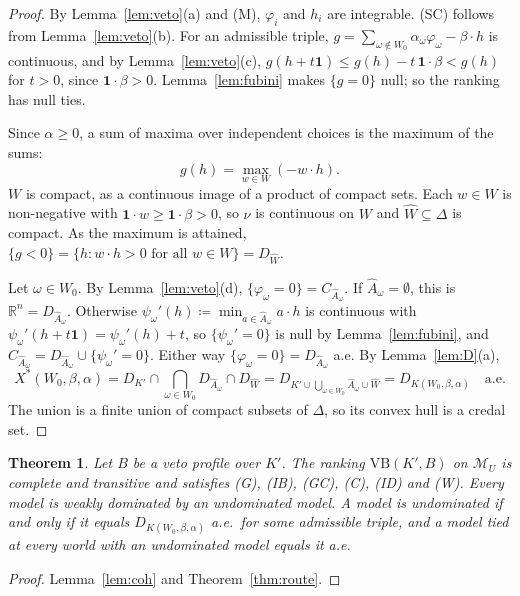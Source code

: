 \documentclass[11pt]{article}
\newcommand{\R}{\mathbb{R}}
\newcommand{\one}{\mathbf{1}}
\newcommand{\M}{\mathcal{M}}
\newcommand{\VB}{\mathrm{VB}}
\theoremstyle{plain}
\newtheorem{theorem}{Theorem}[section]
\theoremstyle{definition}
\theoremstyle{remark}
\begin{document}
\begin{proof}
By Lemma~\ref{lem:veto}(a) and (M), $\varphi_i$ and $h_i$ are integrable. (SC) follows from
Lemma~\ref{lem:veto}(b). For an admissible triple, $g=\sum_{\omega\notin W_0}
\alpha_\omega\varphi_\omega-\beta\cdot h$ is continuous, and by Lemma~\ref{lem:veto}(c),
$g(h+t\one)\le g(h)-t\,\one\cdot\beta<g(h)$ for $t>0$, since $\one\cdot\beta>0$.
Lemma~\ref{lem:fubini} makes $\{g=0\}$ null; so the ranking has null ties.

Since $\alpha\ge0$, a sum of maxima over independent choices is the maximum of the sums:
\[
  g(h)=\max_{w\in W}(-w\cdot h).
\]
$W$ is compact, as a continuous image of a product of compact sets. Each $w\in W$ is
non-negative with $\one\cdot w\ge\one\cdot\beta>0$, so $\nu$ is continuous on $W$ and
$\hat W\subseteq\Delta$ is compact. As the maximum is attained, $\{g<0\}=\{h:w\cdot h>0
\text{ for all }w\in W\}=D_{\hat W}$.

Let $\omega\in W_0$. By Lemma~\ref{lem:veto}(d), $\{\varphi_\omega=0\}=C_{\hat
A_\omega}$. If $\hat A_\omega=\emptyset$, this is $\R^n=D_{\hat A_\omega}$. Otherwise
$\psi_\omega'(h)\coloneqq\min_{a\in\hat A_\omega}a\cdot h$ is continuous with
$\psi_\omega'(h+t\one)=\psi_\omega'(h)+t$, so $\{\psi_\omega'=0\}$ is null by
Lemma~\ref{lem:fubini}, and $C_{\hat A_\omega}=D_{\hat A_\omega}\cup\{\psi_\omega'=0\}$.
Either way $\{\varphi_\omega=0\}=D_{\hat A_\omega}$ a.e. By Lemma~\ref{lem:D}(a),
\[
  X^\ast(W_0,\beta,\alpha)=D_{K'}\cap\bigcap_{\omega\in W_0}D_{\hat A_\omega}\cap
  D_{\hat W}=D_{K'\cup\bigcup_{\omega\in W_0}\hat A_\omega\cup\hat W}=
  D_{K(W_0,\beta,\alpha)}\quad\text{a.e.}
\]
The union is a finite union of compact subsets of $\Delta$, so its convex hull is a
credal set.
\end{proof}

\begin{theorem}\label{thm:family}
Let $B$ be a veto profile over $K'$. The ranking $\VB(K',B)$ on $\M_U$ is complete and
transitive and satisfies (G), (IB), (GC), (C), (ID) and (W). Every model is weakly dominated
by an undominated model. A model is undominated if and only if it equals
$D_{K(W_0,\beta,\alpha)}$ a.e.\ for some admissible triple, and a model tied at every world
with an undominated model equals it a.e.
\end{theorem}

\begin{proof}
Lemma~\ref{lem:coh} and Theorem~\ref{thm:route}.
\end{proof}
\end{document}
